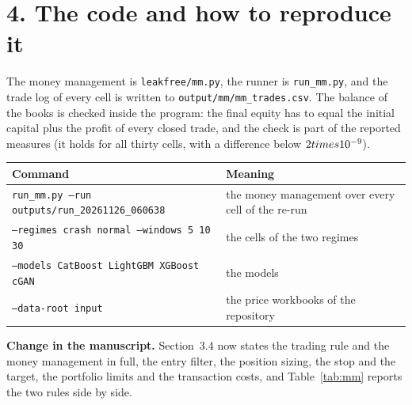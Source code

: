 \documentclass[11pt,a4paper]{article}
\newcommand{\change}[1]{\vspace{0.25em}\noindent\textbf{Change in the manuscript.} #1\par\vspace{0.2em}}
\begin{document}
\section*{4. The code and how to reproduce it}

The money management is \texttt{leakfree/mm.py}, the runner is
\texttt{run\_mm.py}, and the trade log of every cell is written to
\texttt{output/mm/mm\_trades.csv}. The balance of the books is checked inside
the program: the final equity has to equal the initial capital plus the
profit of every closed trade, and the check is part of the reported measures
(it holds for all thirty cells, with a difference below $2\\times10^{-9}$).

\begin{center}\small
\begin{tabular}{p{}p{}}
\toprule
Command & Meaning \\
\midrule
\texttt{run\_mm.py --run outputs/run\_20261126\_060638} & the money management over every cell of the re-run \\
\texttt{--regimes crash normal --windows 5 10 30} & the cells of the two regimes \\
\texttt{--models CatBoost LightGBM XGBoost cGAN} & the models \\
\texttt{--data-root input} & the price workbooks of the repository \\
\bottomrule
\end{tabular}
\end{center}

\change{Section~3.4 now states the trading rule and the money management in full,
the entry filter, the position sizing, the stop and the target, the portfolio
limits and the transaction costs, and Table~\ref{tab:mm} reports the two rules
side by side.}
\end{document}
